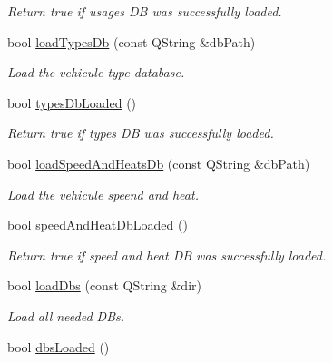 \begin{DoxyCompactItemize}
\begin{DoxyCompactList}\small\item\em Return true if usages DB was successfully loaded. \end{DoxyCompactList}\item 
bool \hyperlink{classmdt_uic_number_a98c879c7bb7412caac4612a46586b76d}{loadTypesDb} (const QString \&dbPath)
\begin{DoxyCompactList}\small\item\em Load the vehicule type database. \end{DoxyCompactList}\item 
\hypertarget{classmdt_uic_number_a39fb254207bfe6dd6eaade2711030dac}{
bool \hyperlink{classmdt_uic_number_a39fb254207bfe6dd6eaade2711030dac}{typesDbLoaded} ()}
\label{classmdt_uic_number_a39fb254207bfe6dd6eaade2711030dac}

\begin{DoxyCompactList}\small\item\em Return true if types DB was successfully loaded. \end{DoxyCompactList}\item 
bool \hyperlink{classmdt_uic_number_ab1d08c2ea34f310631866d2e46010363}{loadSpeedAndHeatsDb} (const QString \&dbPath)
\begin{DoxyCompactList}\small\item\em Load the vehicule speend and heat. \end{DoxyCompactList}\item 
\hypertarget{classmdt_uic_number_a42ec71258e2120337953c8c6bda63638}{
bool \hyperlink{classmdt_uic_number_a42ec71258e2120337953c8c6bda63638}{speedAndHeatDbLoaded} ()}
\label{classmdt_uic_number_a42ec71258e2120337953c8c6bda63638}

\begin{DoxyCompactList}\small\item\em Return true if speed and heat DB was successfully loaded. \end{DoxyCompactList}\item 
bool \hyperlink{classmdt_uic_number_ab7d29b1cb5fe5ac58bef5bec787e83df}{loadDbs} (const QString \&dir)
\begin{DoxyCompactList}\small\item\em Load all needed DBs. \end{DoxyCompactList}\item 
\hypertarget{classmdt_uic_number_ab684e8290b0a74a05e992699bf0fa7f4}{
bool \hyperlink{classmdt_uic_number_ab684e8290b0a74a05e992699bf0fa7f4}{dbsLoaded} ()}
\label{classmdt_uic_number_ab684e8290b0a74a05e992699bf0fa7f4}


\end{DoxyCompactItemize}
